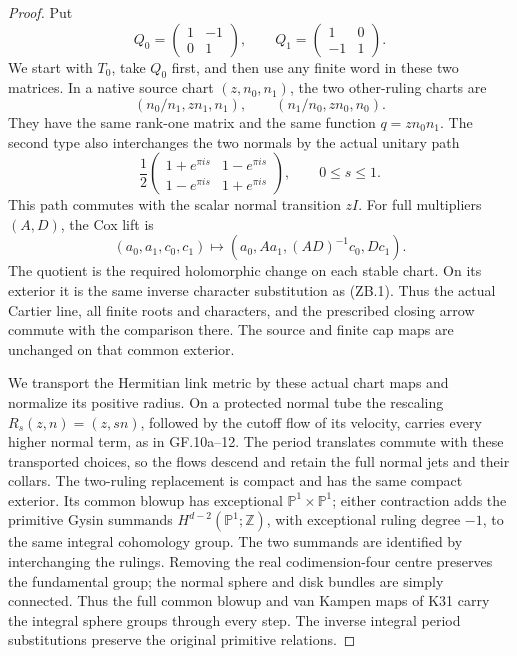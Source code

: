 \begin{proof}
Put
\[
Q_0=\begin{pmatrix}1&-1\\0&1\end{pmatrix},\qquad
Q_1=\begin{pmatrix}1&0\\-1&1\end{pmatrix}.
\]
We start with \(T_0\), take \(Q_0\) first, and then use any finite
word in these two matrices. In a native source chart
\((z,n_0,n_1)\), the two other-ruling charts are
\[
(n_0/n_1,zn_1,n_1),\qquad(n_1/n_0,zn_0,n_0).              \tag{ZB.2}
\]
They have the same rank-one matrix and the same function
\(q=zn_0n_1\). The second type also interchanges the two normals by
the actual unitary path
\[
\frac12\begin{pmatrix}
1+e^{\pi is}&1-e^{\pi is}\\1-e^{\pi is}&1+e^{\pi is}
\end{pmatrix},\qquad 0\le s\le1.                         \tag{ZB.3}
\]
This path commutes with the scalar normal transition \(zI\).
For full multipliers \((A,D)\), the Cox lift is
\[
(a_0,a_1,c_0,c_1)\longmapsto
(a_0,Aa_1,(AD)^{-1}c_0,Dc_1).                            \tag{ZB.4}
\]
The quotient is the required holomorphic change on each stable chart.
On its exterior it is the same inverse character substitution as
(ZB.1). Thus the actual Cartier line, all finite roots and characters,
and the prescribed closing arrow commute with the comparison there.
The source and finite cap maps are unchanged on that common exterior.

We transport the Hermitian link metric by these actual chart maps and
normalize its positive radius. On a protected normal tube the rescaling
\(R_s(z,n)=(z,sn)\), followed by the cutoff flow of its velocity,
carries every higher normal term, as in GF.10a--12. The period
translates commute with these transported choices, so the flows descend
and retain the full normal jets and their collars. The two-ruling
replacement is compact and has the same compact exterior.
Its common blowup has exceptional \(\mathbb P^1\times\mathbb P^1\);
either contraction adds the primitive Gysin summands
\(H^{d-2}(\mathbb P^1;\mathbb Z)\), with exceptional ruling degree
\(-1\), to the same integral cohomology group. The two summands are
identified by interchanging the rulings. Removing the real
codimension-four centre preserves the fundamental group; the normal
sphere and disk bundles are simply connected. Thus the full common
blowup and van Kampen maps of K31 carry the integral sphere groups
through every step. The inverse integral period substitutions preserve
the original primitive relations.


\end{proof}
